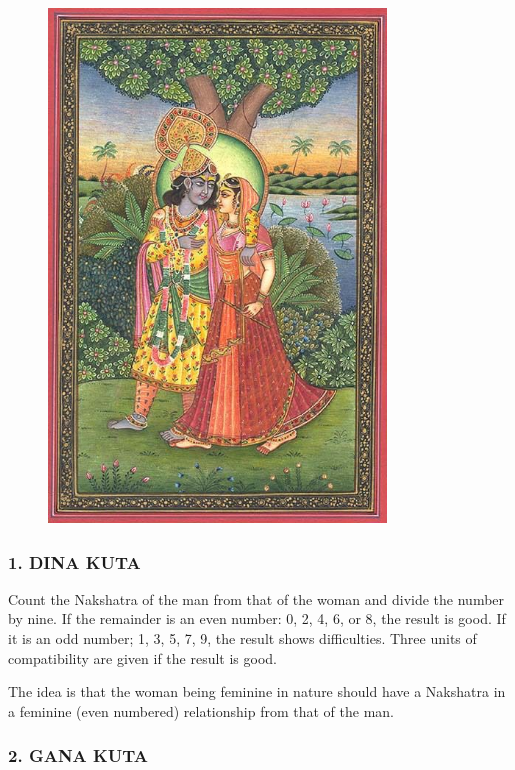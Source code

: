  
\begin{figure}[H]
 \centering
\includegraphics[width=0.8\textwidth]{pics/relationship1.png}
 \end{figure}

 

\subsubsection{1. DINA KUTA}
 

Count the Nakshatra of the man from that of the woman and divide the number by nine.
If the remainder is an even number: 0, 2, 4, 6, or 8, the result is good. If it is an odd number; 1, 3, 5, 7, 9, the result shows difficulties. Three units of compatibility are given if the result is good.
 

The idea is that the woman being feminine in nature should have a Nakshatra in a feminine (even numbered) relationship from that of the man.

 

\subsubsection{2. GANA KUTA}
 

